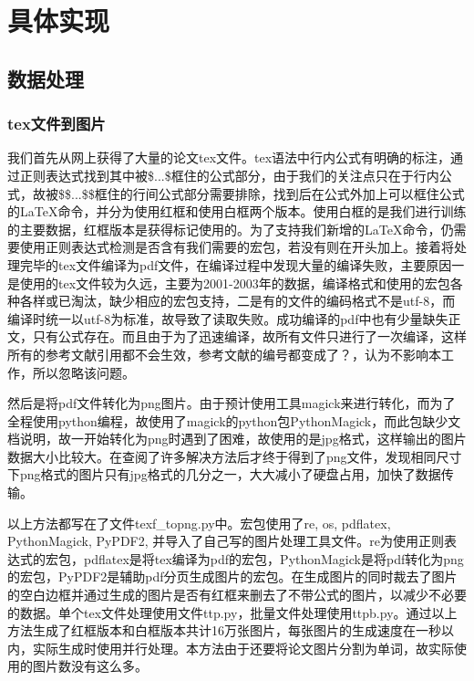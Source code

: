 
\chapter{具体实现}

\section{数据处理}

\subsection{tex文件到图片}
\noindent

我们首先从网上获得了大量的论文tex文件。tex语法中行内公式有明确的标注，通过正则表达式找到其中被\$...\$框住的公式部分，由于我们的关注点只在于行内公式，故被\$\$...\$\$框住的行间公式部分需要排除，找到后在公式外加上可以框住公式的LaTeX命令，并分为使用红框和使用白框两个版本。使用白框的是我们进行训练的主要数据，红框版本是获得标记使用的。为了支持我们新增的LaTeX命令，仍需要使用正则表达式检测是否含有我们需要的宏包，若没有则在开头加上。接着将处理完毕的tex文件编译为pdf文件，在编译过程中发现大量的编译失败，主要原因一是使用的tex文件较为久远，主要为2001-2003年的数据，编译格式和使用的宏包各种各样或已淘汰，缺少相应的宏包支持，二是有的文件的编码格式不是utf-8，而编译时统一以utf-8为标准，故导致了读取失败。成功编译的pdf中也有少量缺失正文，只有公式存在。而且由于为了迅速编译，故所有文件只进行了一次编译，这样所有的参考文献引用都不会生效，参考文献的编号都变成了？，认为不影响本工作，所以忽略该问题。

然后是将pdf文件转化为png图片。由于预计使用工具magick来进行转化，而为了全程使用python编程，故使用了magick的python包PythonMagick，而此包缺少文档说明，故一开始转化为png时遇到了困难，故使用的是jpg格式，这样输出的图片数据大小比较大。在查阅了许多解决方法后才终于得到了png文件，发现相同尺寸下png格式的图片只有jpg格式的几分之一，大大减小了硬盘占用，加快了数据传输。

以上方法都写在了文件texf\_topng.py中。宏包使用了re, os, pdflatex, PythonMagick, PyPDF2, 并导入了自己写的图片处理工具文件。re为使用正则表达式的宏包，pdflatex是将tex编译为pdf的宏包，PythonMagick是将pdf转化为png的宏包，PyPDF2是辅助pdf分页生成图片的宏包。在生成图片的同时裁去了图片的空白边框并通过生成的图片是否有红框来删去了不带公式的图片，以减少不必要的数据。单个tex文件处理使用文件ttp.py，批量文件处理使用ttpb.py。通过以上方法生成了红框版本和白框版本共计16万张图片，每张图片的生成速度在一秒以内，实际生成时使用并行处理。本方法由于还要将论文图片分割为单词，故实际使用的图片数没有这么多。

